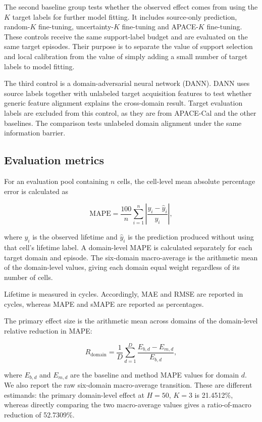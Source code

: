 \documentclass[preprint,12pt]{elsarticle}
\begin{document}
The second baseline group tests whether the observed effect comes from using the $K$ target labels for further model fitting. It includes source-only prediction, random-$K$ fine-tuning, uncertainty-$K$ fine-tuning and APACE-$K$ fine-tuning. These controls receive the same support-label budget and are evaluated on the same target episodes. Their purpose is to separate the value of support selection and local calibration from the value of simply adding a small number of target labels to model fitting.

The third control is a domain-adversarial neural network (DANN). DANN uses source labels together with unlabeled target acquisition features to test whether generic feature alignment explains the cross-domain result. Target evaluation labels are excluded from this control, as they are from APACE-Cal and the other baselines. The comparison tests unlabeled domain alignment under the same information barrier.

\subsection{Evaluation metrics}

For an evaluation pool containing $n$ cells, the cell-level mean absolute percentage error is calculated as

\begin{equation}
\mathrm{MAPE}=\frac{100}{n}\sum_{i=1}^{n}\left|\frac{y_i-\hat{y}_i}{y_i}\right|,
\end{equation}

where $y_i$ is the observed lifetime and $\hat{y}_i$ is the prediction produced without using that cell's lifetime label. A domain-level MAPE is calculated separately for each target domain and episode. The six-domain macro-average is the arithmetic mean of the domain-level values, giving each domain equal weight regardless of its number of cells.

Lifetime is measured in cycles. Accordingly, MAE and RMSE are reported in cycles, whereas MAPE and sMAPE are reported as percentages.

The primary effect size is the arithmetic mean across domains of the domain-level relative reduction in MAPE:

\begin{equation}
R_{\mathrm{domain}}=\frac{1}{D}\sum_{d=1}^{D}\frac{E_{b,d}-E_{m,d}}{E_{b,d}},
\end{equation}

where $E_{b,d}$ and $E_{m,d}$ are the baseline and method MAPE values for domain $d$. We also report the raw six-domain macro-average transition. These are different estimands: the primary domain-level effect at $H=50$, $K=3$ is 21.4512\%, whereas directly comparing the two macro-average values gives a ratio-of-macro reduction of 52.7309\%.
\end{document}
